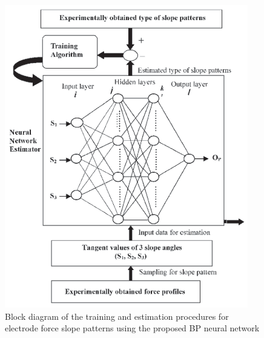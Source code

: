 \documentclass[english,ngerman]{tudscrreprt}
\begin{document}
\begin{figure}[H]
\centering
\includegraphics[scale = 0.8]{./Bilder/Block diagram of the training and estimation procedures for electrode force slope patterns using the proposed BP neural network.png}
\caption{Block diagram of the training and estimation procedures for electrode force slope patterns using the proposed BP neural network}\label{fgg:T}
\end{figure}


\newpage
\end{document}
